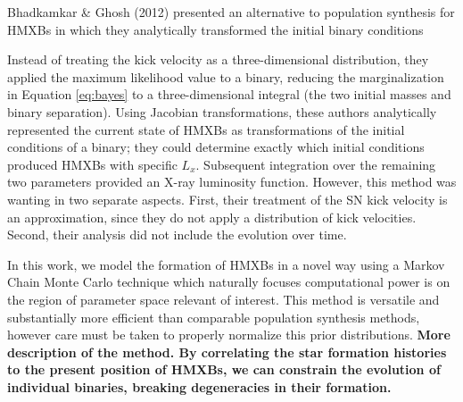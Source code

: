 \documentclass[12pt, preprint]{aastex}
\begin{document}
Bhadkamkar \& Ghosh (2012) presented an alternative to population synthesis for HMXBs in which they analytically transformed the initial binary conditions 


 Instead of treating the kick velocity as a three-dimensional distribution, they applied the maximum likelihood value to a binary, reducing the marginalization in Equation \ref{eq:bayes} to a three-dimensional integral (the two initial masses and binary separation). Using Jacobian transformations, these authors analytically represented the current state of HMXBs as transformations of the initial conditions of a binary; they could determine exactly which initial conditions produced HMXBs with specific $L_x$. Subsequent integration over the remaining two parameters provided an X-ray luminosity function. However, this method was wanting in two separate aspects. First, their treatment of the SN kick velocity is an approximation, since they do not apply a distribution of kick velocities. Second, their analysis did not include the evolution over time. 







In this work, we model the formation of HMXBs in a novel way using a Markov Chain Monte Carlo technique which naturally focuses computational power is on the region of parameter space relevant of interest. This method is versatile and substantially more efficient than comparable population synthesis methods, however care must be taken to properly normalize this prior distributions. {\bf More description of the method. By correlating the star formation histories to the present position of HMXBs, we can constrain the evolution of individual binaries, breaking degeneracies in their formation.} 
\end{document}

